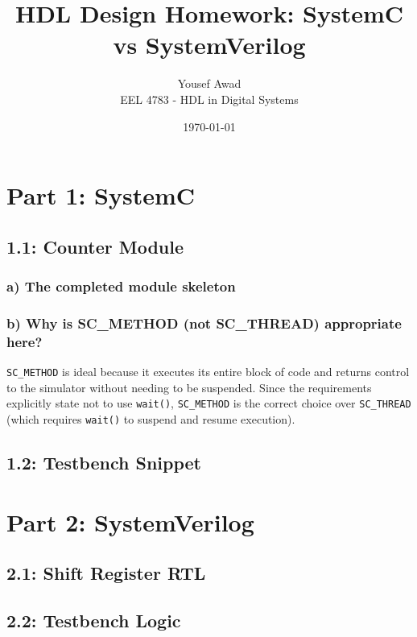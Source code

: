 \documentclass[11pt, letterpaper]{article}
\title{HDL Design Homework: SystemC vs SystemVerilog}
\author{Yousef Awad \\ EEL 4783 - HDL in Digital Systems}
\date{\today}
\begin{document}
\maketitle

\section*{Part 1: SystemC}

\subsection*{1.1: Counter Module}
\subsubsection*{a) The completed module skeleton}


\subsubsection*{b) Why is SC\_METHOD (not SC\_THREAD) appropriate here?}
\texttt{SC\_METHOD} is ideal because it executes its entire block of code and returns control to the simulator without needing to be suspended. Since the requirements explicitly state not to use \texttt{wait()}, \texttt{SC\_METHOD} is the correct choice over \texttt{SC\_THREAD} (which requires \texttt{wait()} to suspend and resume execution).

\pagebreak
\subsection*{1.2: Testbench Snippet}


\newpage
\section*{Part 2: SystemVerilog}

\subsection*{2.1: Shift Register RTL}


\subsection*{2.2: Testbench Logic}

\end{document}
